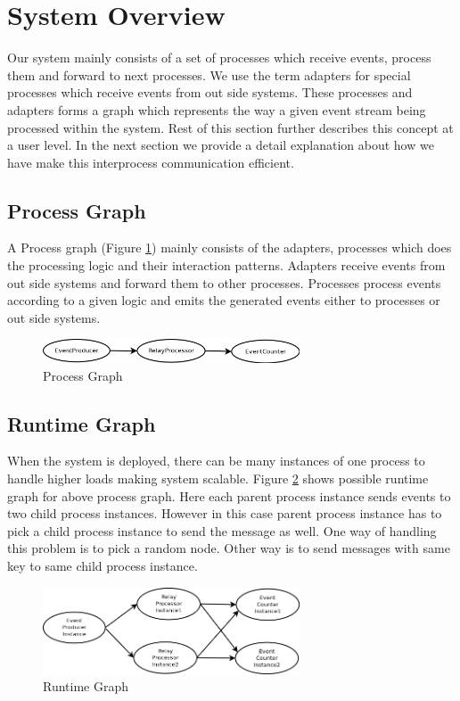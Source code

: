\section{System Overview}
Our system mainly consists of a set of processes which receive events, process them and forward to next processes. We use the term adapters for special processes which receive events from out side systems. These processes and adapters forms a graph which represents the way a given event stream being processed within the system. Rest of this section further describes this concept at a user level. In the next section we provide a detail explanation about how we have make this interprocess communication efficient.
\subsection{Process Graph}
A Process graph (Figure \ref{processgraph}) mainly consists of the adapters, processes which does the processing logic and their interaction patterns. Adapters receive events from out side systems and forward them to other processes. Processes process events according to a given logic and emits the generated events either to processes or out side systems. 

\begin{figure}[!t]
	\centering
	\includegraphics[width=3.0in]{processgraph.png}
	\caption{Process Graph}
	\label{processgraph}
\end{figure}

\subsection{Runtime Graph}
When the system is deployed, there can be many instances of one process to handle higher loads making system scalable. Figure \ref{runtimegraph} shows possible runtime graph for above process graph. Here each parent process instance sends events to two child process instances. However in this case parent process instance has to pick a child process instance to send the message as well. One way of handling this problem is to pick a random node. Other way is to send messages with same key to same child process instance. 

\begin{figure}[!t]
        \centering
        \includegraphics[width=3.0in]{runtimegraph.png}
        \caption{Runtime Graph}
        \label{runtimegraph}
\end{figure}

